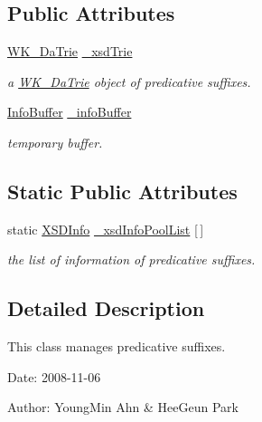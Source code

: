 \subsection*{Public Attributes}
\begin{CompactItemize}
\item 
\hyperlink{classkmaOrange_1_1WK__DaTrie}{WK\_\-DaTrie} \hyperlink{classkmaOrange_1_1PredicativeSuffix_93d8262550760d5f74133e7a4f4a5b54}{\_\-xsdTrie}
\begin{CompactList}\small\item\em a \hyperlink{classkmaOrange_1_1WK__DaTrie}{WK\_\-DaTrie} object of predicative suffixes. \item\end{CompactList}\item 
\hyperlink{classkmaOrange_1_1InfoBuffer}{InfoBuffer} \hyperlink{classkmaOrange_1_1PredicativeSuffix_0f9606b85a92a39e666c05d41b6454ea}{\_\-infoBuffer}
\begin{CompactList}\small\item\em temporary buffer. \item\end{CompactList}\end{CompactItemize}
\subsection*{Static Public Attributes}
\begin{CompactItemize}
\item 
static \hyperlink{structkmaOrange_1_1XSDInfo}{XSDInfo} \hyperlink{classkmaOrange_1_1PredicativeSuffix_cd1fbf180be11ec4e223f352bc173316}{\_\-xsdInfoPoolList} \mbox{[}$\,$\mbox{]}
\begin{CompactList}\small\item\em the list of information of predicative suffixes. \item\end{CompactList}\end{CompactItemize}


\subsection{Detailed Description}
This class manages predicative suffixes. 

\begin{Desc}
\item[Date:]2008-11-06 \end{Desc}
\begin{Desc}
\item[Author:]YoungMin Ahn \& HeeGeun Park \end{Desc}


